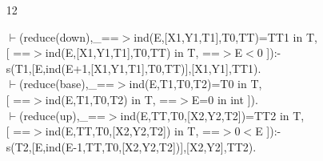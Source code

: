 \documentclass[11pt]{report}
\begin{document}
\begin{enumerate}
 \begin{description}
 \item[$\circ$]
\begin{sf}\begin{tabbing}
$\vdash$(intro(new[U,V,W]),H==$>$ind(E,[X1,Y1,T1],T0,[X2,Y2,T2]) in T,\\[-0.15ex]
\hspace{2em}[ ==$>$E in int,\\[-0.15ex]
\hspace{3em}[U:int,W:U$<$0,V:T]==$>$TT1 in T, \\[-0.15ex]
\hspace{3em}==$>$T0 in T, \\[-0.15ex]
\hspace{3em}[U:int,W:0$<$U,V:T]==$>$TT2 in T ]):-\\[-0.15ex]
\hspace{2em}{\bf derived},free([U,V,W],H),\\[-0.15ex]
\hspace{2em}s(T1,[U,V],[X1,Y1],TT1),s(T2,[U,V],[X2,Y2],TT2).
\end{tabbing}\end{sf}

 \end{description}
  
 \item[12]
\begin{sf}\begin{tabbing}
$\vdash$(reduce(down),\_\hspace{0.1em}==$>$ind(E,[X1,Y1,T1],T0,TT)=TT1 in T, \\[-0.15ex]
\hspace{2em}[ ==$>$ind(E,[X1,Y1,T1],T0,TT) in T, ==$>$E$<$0 ]):-\\[-0.15ex]
\hspace{2em}s(T1,[E,ind(E+1,[X1,Y1,T1],T0,TT)],[X1,Y1],TT1).\\[-0.15ex]
$\vdash$(reduce(base),\_\hspace{0.1em}==$>$ind(E,T1,T0,T2)=T0 in T, \\[-0.15ex]
\hspace{2em}[ ==$>$ind(E,T1,T0,T2) in T, ==$>$E=0 in int ]).\\[-0.15ex]
$\vdash$(reduce(up),\_\hspace{0.1em}==$>$ind(E,TT,T0,[X2,Y2,T2])=TT2 in T, \\[-0.15ex]
\hspace{2em}[ ==$>$ind(E,TT,T0,[X2,Y2,T2]) in T, ==$>$0$<$E ]):-\\[-0.15ex]
\hspace{2em}s(T2,[E,ind(E-1,TT,T0,[X2,Y2,T2])],[X2,Y2],TT2).
\end{tabbing}\end{sf}


\end{enumerate}
\end{document}
